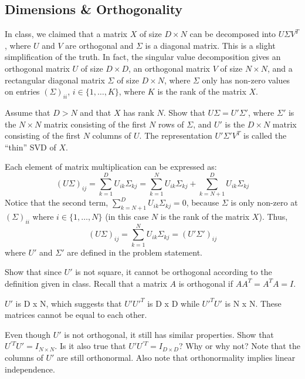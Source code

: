 \subsection{Dimensions \& Orthogonality} In class, we claimed that a matrix $X$ of size $D \times N$ can be decomposed into $U\Sigma V^T$, where $U$ and $V$ are orthogonal and $\Sigma$ is a diagonal matrix. This is a slight simplification of the truth. In fact, the singular value decomposition gives an orthogonal matrix $U$ of size $D \times D$, an orthogonal matrix $V$ of size $N \times N$, and a rectangular diagonal matrix $\Sigma$ of size $D \times N$, where $\Sigma$ only has non-zero values on entries $(\Sigma)_{ii}$, $i \in \{1, \ldots, K\}$, where $K$ is the rank of the matrix $X$. 

\problem[3] Assume that $D > N$ and that $X$ has rank $N$. Show that $U\Sigma = U'\Sigma'$, where $\Sigma'$ is the $N \times N$ matrix consisting of the first $N$ rows of $\Sigma$, and $U'$ is the $D \times N$ matrix consisting of the first $N$ columns of $U$. The representation $U'\Sigma' V^T$ is called the ``thin'' SVD of $X$.

\begin{solution}
	Each element of matrix multiplication can be expressed as:
	\begin{equation}
		(U\Sigma )_{ij} = \sum_{k=1}^D U_{ik}\Sigma_{kj} = \sum_{k=1}^N U_{ik}\Sigma_{kj} + \sum_{k=N+1}^D U_{ik}\Sigma_{kj}
	\end{equation}
	Notice that the second term, $\sum_{k=N+1}^D U_{ik}\Sigma_{kj} = 0$, because $\Sigma$ is only non-zero at $(\Sigma)_{ii}$ where $i \in \{1, \ldots, N\}$ (in this case $N$ is the rank of the matrix $X$). Thus,
	\begin{equation}
		(U\Sigma )_{ij} = \sum_{k=1}^N U_{ik}\Sigma_{kj} = (U'\Sigma ')_{ij}
	\end{equation}
	where $U'$ and $\Sigma'$ are defined in the problem statement.
\end{solution}

\problem[3] Show that since $U'$ is not square, it cannot be orthogonal according to the definition given in class. Recall that a matrix $A$ is orthogonal if $A A^T = A^T A = I$.

\begin{solution}
	$U'$ is  D x N, which suggests that $U'U'^T$ is D x D while $U'^TU'$ is N x N. These matrices cannot be equal to each other.
\end{solution} 

\problem[4] Even though $U'$ is not orthogonal, it still has similar properties. Show that $U^{'T} U' = I_{N \times N}$. Is it also true that $U' U^{'T} = I_{D \times D}$? Why or why not? Note that the columns of $U'$ are still orthonormal. Also note that orthonormality implies linear independence.

